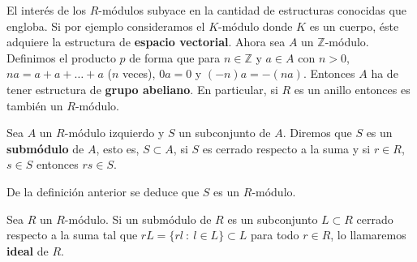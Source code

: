 \begin{ejemplo}
	El interés de los $R$-módulos subyace en la cantidad de estructuras conocidas que engloba. Si por ejemplo consideramos el $K$-módulo donde $K$ es un cuerpo, éste adquiere la estructura de \textbf{espacio vectorial}. Ahora sea $A$ un $\mathbb{Z}$-módulo. Definimos el producto $p$ de forma que para $n \in \mathbb{Z}$ y $a \in A$ con $n>0$, $na = a + a + \dots + a$ ($n$ veces), $0a=0$ y $(-n)a = -(na)$. Entonces $A$ ha de tener estructura de \textbf{grupo abeliano}. En particular, si $R$ es un anillo entonces es también un $R$-módulo.
\end{ejemplo}

\begin{definicion}
	Sea $A$ un $R$-módulo izquierdo y $S$ un subconjunto de $A$. Diremos que $S$ es un \textbf{submódulo} de $A$, esto es, $S \subset A$, si $S$ es cerrado respecto a la suma y si $r \in R$, $s \in S$ entonces $rs \in S$.
\end{definicion}
De la definición anterior se deduce que $S$ es un $R$-módulo.
\begin{definicion}
	Sea $R$ un $R$-módulo.	Si un submódulo de $R$ es un subconjunto $L \subset R$ cerrado respecto a la suma tal que $rL = \{rl \ : \ l \in L\} \subset L$ para todo $r \in R$, lo llamaremos \textbf{ideal} de $R$.
\end{definicion}

